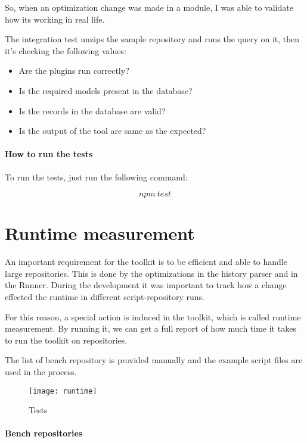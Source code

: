 So, when an optimization change was made in a module, I was able to validate how its working in real life.

The integration test unzips the sample repository and runs the query on it, then it’s checking the following values:

\begin{itemize}
	\item Are the plugins run correctly?
	\item Is the required models present in the database?
	\item Is the records in the database are valid?
	\item Is the output of the tool are same as the expected?
\end{itemize}

\subsubsection{How to run the tests}

To run the tests, just run the following command:

\[ npm\ test \]


\chapter{Runtime measurement}
\label{appx:simulation}

An important requirement for the toolkit is to be efficient and able to handle large repositories. This is done by the optimizations in the history parser and in the Runner. During the development it was important to track how a change effected the runtime in different script-repository runs.   

For this reason, a special action is induced in the toolkit, which is called runtime measurement. By running it, we can get a full report of how much time it takes to run the toolkit on repositories.

The list of bench repository is provided manually and the example script files are used in the process.

\begin{figure}[H]
	\centering
	\texttt{[image: runtime]}
	\caption{Tests}
	\label{fig:fig-runtime}
\end{figure}

\subsubsection{Bench repositories}

